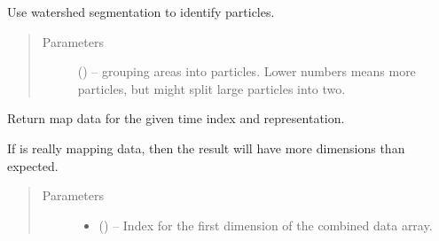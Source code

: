 \documentclass[letterpaper,10pt,english]{sphinxmanual}
\begin{document}
\begin{fulllineitems}
\begin{fulllineitems}
\end{fulllineitems}


\begin{fulllineitems}
\label{\detokenize{xanespy:xanespy.xanes_frameset.XanesFrameset.image_normalizer}}
\end{fulllineitems}


\begin{fulllineitems}
\label{\detokenize{xanespy:xanespy.xanes_frameset.XanesFrameset.is_background}}
\end{fulllineitems}


\begin{fulllineitems}
\label{\detokenize{xanespy:xanespy.xanes_frameset.XanesFrameset.label_particles}}
Use watershed segmentation to identify particles.
\begin{quote}\begin{description}
\item[{Parameters}] \leavevmode
{} (\sphinxstyleliteralemphasis{-}) -- grouping areas into particles. Lower numbers means more
particles, but might split large particles into two.

\end{description}\end{quote}

\end{fulllineitems}


\begin{fulllineitems}
\label{\detokenize{xanespy:xanespy.xanes_frameset.XanesFrameset.map_data}}
Return map data for the given time index and representation.

If  is really mapping data, then the result
will have more dimensions than expected.
\begin{quote}\begin{description}
\item[{Parameters}] \leavevmode\begin{itemize}
\item {} 
 () -- Index for the first dimension of the combined data array.


\end{itemize}
\end{description}
\end{quote}
\end{fulllineitems}
\end{fulllineitems}
\end{document}
